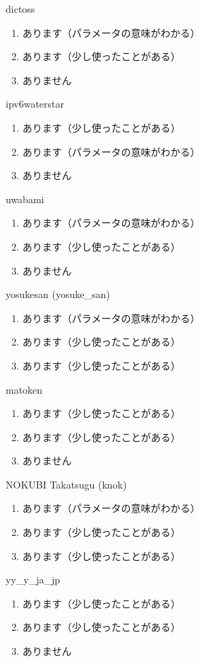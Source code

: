 \begin{prework}{ dictoss }
  \begin{enumerate}
  \item あります（パラメータの意味がわかる）
  \item あります（少し使ったことがある）
  \item ありません
  \end{enumerate}
\end{prework}

\begin{prework}{ ipv6waterstar }
  \begin{enumerate}
  \item あります（少し使ったことがある）
  \item あります（パラメータの意味がわかる）
  \item ありません
  \end{enumerate}
\end{prework}

\begin{prework}{ uwabami }
  \begin{enumerate}
  \item あります（パラメータの意味がわかる）
  \item あります（少し使ったことがある）
  \item ありません
  \end{enumerate}
\end{prework}

\begin{prework}{ yosukesan (yosuke\_san) }
  \begin{enumerate}
  \item あります（パラメータの意味がわかる）
  \item あります（少し使ったことがある）
  \item あります（少し使ったことがある）
  \end{enumerate}
\end{prework}

\begin{prework}{ matoken }
  \begin{enumerate}
  \item あります（少し使ったことがある）
  \item あります（少し使ったことがある）
  \item ありません
  \end{enumerate}
\end{prework}

\begin{prework}{ NOKUBI Takatsugu (knok) }
  \begin{enumerate}
  \item あります（パラメータの意味がわかる）
  \item あります（少し使ったことがある）
  \item あります（少し使ったことがある）
  \end{enumerate}
\end{prework}

\begin{prework}{ yy\_y\_ja\_jp }
  \begin{enumerate}
  \item あります（少し使ったことがある）
  \item あります（少し使ったことがある）
  \item ありません
  \end{enumerate}
\end{prework}
